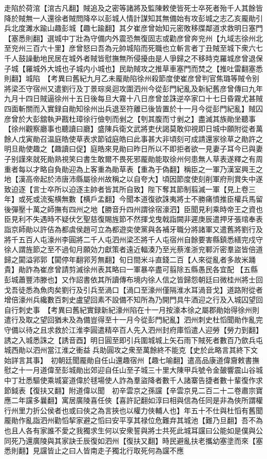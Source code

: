 走陷於荷涫【涫古凡翻】賊追及之密等諸將及監陳敕使皆死士卒死者殆千人其餘皆降於賊無一人還徐者賊問降卒以彭城人情計謀知其無備始有攻彭城之志乙亥龎勛引兵北度濉水踰山趣彭城【趣七踰翻】其夕崔彦曾始知元密敗移牒鄰道求救明日塞門【塞悉則翻】選城中丁壯為守備内外震恐無復固志或勸彦曾奔兖州【九域志徐州北至兖州三百六十里】彦曾怒曰吾為元帥城陷而死職也立斬言者丁丑賊至城下衆六七千人鼓譟動地民居在城外者賊皆慰撫無所侵擾由是人爭歸之不移時克羅城彦曾退保子城【羅城外大城也子城内小城也】民助賊攻之推草車塞門而焚之【推吐雷翻塞悉則翻】城陷　【考異曰舊紀九月乙未龎勛陷徐州殺節度使崔彦曾判官焦璐等賊令别將梁丕守宿州又遣劉行及丁景琮吳迴攻圍泗州今從彭門紀亂及新紀舊彦曾傳曰九年九月十四日賊逼徐州十五日後每旦大霧十八日彦曾並誅逆卒家口十七日昏霧尤甚賊四面斬關而入實録自勛知徐州出兵退至符離已後皆置於十一月今從彭門紀亂】賊囚彦曾於大彭舘執尹戡杜璋徐行儉刳而剉之【刳其腹而寸剉之】盡滅其族勛坐聽事【徐州觀察廳事也聽讀曰廳】盛陳兵衛文武將吏伏謁莫敢仰視即日城中願附從者萬餘人戊寅勛召温庭皓使草表求節钺庭皓曰此事甚大非頃刻可成請還家徐草之勛許之明旦勛使趣之【趣讀曰促】庭皓來見勛曰昨日所以不即拒者欲一見妻子耳今已與妻子别謹來就死勛熟視笑曰書生敢爾不畏死邪龎勛能取徐州何患無人草表遂釋之有周重者每以才略自負勛迎為上客重為勛草表【重為于偽翻】稱臣之一軍乃漢室興王之地【漢高帝起於沛唐沛縣屬徐州故稱之以自夸大】頃因節度使刻削軍府刑賞失中遂致迫逐【言士卒所以迫逐主帥者皆其所自致】陛下奪其節制翦滅一軍【見上卷三年】或死或流寃横無數【横戶孟翻】今聞本道復欲誅夷將士不勝痛憤推臣權兵馬留後彈壓十萬之師撫有四州之地【勝音升四州謂徐宿濠泗】臣聞見利乘時帝王之資也臣見利不失遇時不疑伏乞聖慈復賜旌節不然揮戈曳戟詣闕非遲庚辰遣押牙張琯奉表詣京師勛以許佶為都虞侯趙可立為都遊奕使黨與各補牙職分將諸軍又遣舊將劉行及將千五百人屯濠州李圓將二千人屯泗州梁丕將千人屯宿州自餘要害縣鎮悉繕完戍守徐人謂旌節之至不過旬月願効力獻策者遠近輻湊乃至光蔡淮浙兖鄆沂密羣盜皆倍道歸之闐溢郛郭【闐停年翻郛芳無翻】旬日間米斗直錢二百【人來從亂者多故米踊貴】勛詐為崔彦曾請剪滅徐州表其略曰一軍暴卒盡可翦除五縣愚民各宜配【五縣彭城蕭豐沛滕也】又作詔書依其所讀傳布境内徐人信之皆歸怨朝廷曰微桂州將士回戈吾徒悉為魚肉矣劉行及引兵至渦口【渦口至濠州僅隔淮水耳渦音戈】道路附從者增倍濠州兵纔數百刺史盧望回素不設備不知所為乃開門具牛酒迎之行及入城囚望回自行刺史事　【考異曰舊紀實録新紀濠州陷在十一月按濠本徐之屬郡勛始得徐州則遣行及取之望回猶未及為備豈得至十一月今從彭門紀亂】泗州刺史杜慆聞勛作亂完守備以待之且求救於江淮李圓遣精卒百人先入泗州封府庫慆遣人迎勞【勞力到翻】誘之入城悉誅之【誘音酉】明日圓至即引兵圍城城上矢石雨下賊死者數百乃歛兵屯城西勛以泗州當江淮之衝益兵助圓攻之衆至萬餘終不能克【史於此略言其終下文始詳言其事】　初朝廷聞龎勛自任山還趣宿州【趣七喻翻】遣高品康道偉齎敕書撫慰之十一月道偉至彭城勛出郊迎自任山至子城三十里大陳甲兵號令金皷響震山谷城中丁壯悉驅使乘城宴道偉於毬場使人詐為羣盜降者數千人諸寨告捷者數十輩復作求節鉞表【復扶又翻】附道偉以聞　初辛雲京之孫讜【辛雲京見二百二十二卷肅宗寶應二年讜多曩翻】寓居廣陵喜任俠【喜許記翻如淳曰相與信為任同是非為俠所謂權行州里力折公侯者也或曰俠之為言挾也以權力俠輔人也】年五十不仕與杜慆有舊聞龎勛作亂詣泗州勸慆挈家避之慆曰安平享其禄位危難弃其城池【難乃旦翻】吾不為也且人各有家誰不愛之我獨求生何以安衆誓與將士共死此城耳讜曰公能如是僕與公同死乃還廣陵與其家訣壬辰復如泗州【復扶又翻】時民避亂扶老攜幼塞塗而來【塞悉則翻】見讜皆止之曰人皆南走子獨北行取死何為讜不應